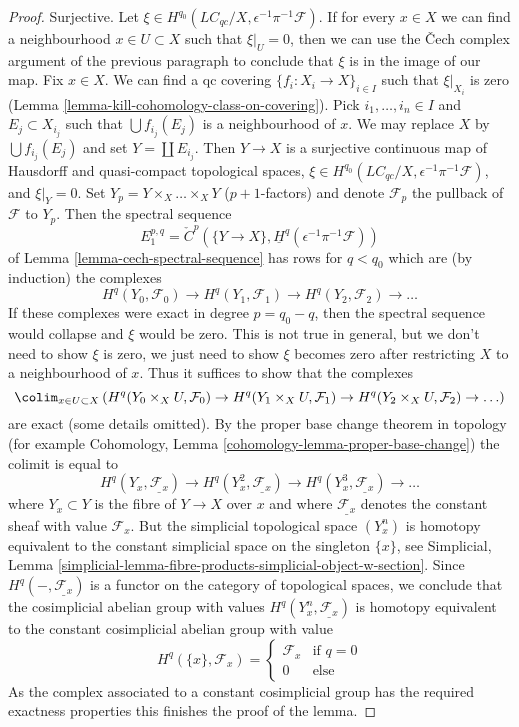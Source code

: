 \begin{proof}
\medskip\noindent
Surjective.
Let $\xi \in H^{q_0}(\textit{LC}_{qc}/X, \epsilon^{-1}\pi^{-1}\mathcal{F})$.
If for every $x \in X$ we can find a neighbourhood $x \in U \subset X$
such that $\xi|_U = 0$, then we can use the {\v C}ech complex argument
of the previous paragraph to conclude that $\xi$ is in the image of
our map. Fix $x \in X$.
We can find a qc covering $\{f_i : X_i \to X\}_{i \in I}$ such that
$\xi|_{X_i}$ is zero (Lemma \ref{lemma-kill-cohomology-class-on-covering}).
Pick $i_1, \ldots, i_n \in I$ and $E_j \subset X_{i_j}$ such that
$\bigcup f_{i_j}(E_j)$ is a neighbourhood of $x$.
We may replace $X$ by $\bigcup f_{i_j}(E_j)$ and set $Y = \coprod E_{i_j}$.
Then $Y \to X$ is a surjective continuous map of Hausdorff and
quasi-compact topological spaces,
$\xi \in H^{q_0}(\textit{LC}_{qc}/X, \epsilon^{-1}\pi^{-1}\mathcal{F})$,
and $\xi|_Y = 0$. Set $Y_p = Y \times_X \ldots \times_X Y$ ($p + 1$-factors)
and denote $\mathcal{F}_p$ the pullback of $\mathcal{F}$ to $Y_p$.
Then the spectral sequence
$$
E_1^{p, q} =
\check{C}^p(\{Y \to X\}, \underline{H}^q(\epsilon^{-1}\pi^{-1}\mathcal{F}))
$$
of Lemma \ref{lemma-cech-spectral-sequence} has
rows for $q < q_0$ which are (by induction) the complexes
$$
H^q(Y_0, \mathcal{F}_0) \to
H^q(Y_1, \mathcal{F}_1) \to
H^q(Y_2, \mathcal{F}_2) \to \ldots
$$
If these complexes were exact in degree $p = q_0 - q$, then
the spectral sequence would collapse and $\xi$ would be zero.
This is not true in general, but we don't need to show $\xi$ is
zero, we just need to show $\xi$ becomes zero after restricting
$X$ to a neighbourhood of $x$. Thus it suffices to show that the
complexes
$$
\colim_{x \in U \subset X} 
\left(
H^q(Y_0 \times_X U, \mathcal{F}_0) \to
H^q(Y_1 \times_X U, \mathcal{F}_1) \to
H^q(Y_2 \times_X U, \mathcal{F}_2) \to \ldots\right)
$$
are exact (some details omitted). By the proper base change
theorem in topology
(for example Cohomology, Lemma \ref{cohomology-lemma-proper-base-change})
the colimit is equal to
$$
H^q(Y_x, \underline{\mathcal{F}_x}) \to
H^q(Y_x^2, \underline{\mathcal{F}_x}) \to
H^q(Y_x^3, \underline{\mathcal{F}_x}) \to \ldots
$$
where $Y_x \subset Y$ is the fibre of $Y \to X$ over $x$
and where $\underline{\mathcal{F}_x}$ denotes the constant sheaf
with value $\mathcal{F}_x$. But the simplicial topological space
$(Y_x^n)$ is homotopy equivalent to the constant simplicial space
on the singleton $\{x\}$, see
Simplicial, Lemma
\ref{simplicial-lemma-fibre-products-simplicial-object-w-section}.
Since $H^q(-, \underline{\mathcal{F}_x})$ is a functor on the
category of topological spaces, we conclude that the cosimplicial
abelian group with values $H^q(Y_x^n, \underline{\mathcal{F}_x})$
is homotopy equivalent to the constant cosimplicial
abelian group with value
$$
H^q(\{x\}, \mathcal{F}_x) =
\left\{
\begin{matrix}
\mathcal{F}_x & \text{if }q = 0 \\
0 & \text{else}
\end{matrix}
\right.
$$
As the complex associated to a constant cosimplicial group
has the required exactness properties this finishes the proof of the lemma.
\end{proof}

